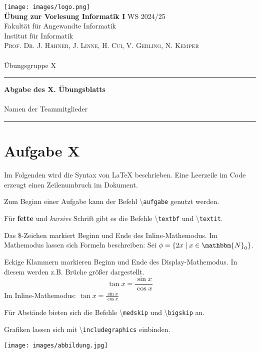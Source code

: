 \documentclass[paper=a4, %
         fontsize=10pt,  %
         oneside,        %
         headsepline,    %
         notitlepage     %
]{scrartcl}              %
\newcommand{\ownline}{\vspace{.7em}\hrule\vspace{.7em}}
\newcommand{\aufgabe}[1]{\section*{Aufgabe #1}}
\begin{document}
\texttt{[image: images/logo.png]} \\
\textbf{Übung zur Vorlesung Informatik I} \hfill{WS 2024/25} \\  
Fakultät für Angewandte Informatik \\
Institut für Informatik \\
\textsc{Prof. Dr. J. Hähner, J. Linne, H. Cui, V. Gerling, N. Kemper} \\
\mbox{} \\
{\large Übungsgruppe X} %
\ownline
\begin{center}
{\LARGE \textbf{Abgabe des X. Übungsblatts}} \\ %
\mbox{} \\
{\large Namen der Teammitglieder} \\ %
\end{center}
\ownline



\aufgabe{X}

Im Folgenden wird die Syntax von LaTeX beschrieben.
Eine Leerzeile im Code erzeugt einen Zeilenumbruch im Dokument.

Zum Beginn einer Aufgabe kann der Befehl \textbackslash\texttt{aufgabe} genutzt werden.

Für \textbf{fette} und \textit{kursive} Schrift gibt es die Befehle \textbackslash\texttt{textbf} und \textbackslash\texttt{textit}.

Das \$-Zeichen markiert Beginn und Ende des Inline-Mathemodus.
Im Mathemodus lassen sich Formeln beschreiben:
Sei $\phi = \{ 2x \mid x \in \mathbbm{N}_0 \}$.

Eckige Klammern markieren Beginn und Ende des Display-Mathemodus.
In diesem werden z.B. Brüche größer dargestellt.
\[ \tan x = \frac{\sin x}{ \cos x} \]
Im Inline-Mathemodus: $\tan x = \frac{\sin x}{ \cos x}$

\bigskip
Für Abstände bieten sich die Befehle \textbackslash\texttt{medskip} und \textbackslash\texttt{bigskip} an.

\bigskip
Grafiken lassen sich mit \textbackslash\texttt{includegraphics} einbinden.

\begin{center}
\texttt{[image: images/abbildung.jpg]}
\end{center}
\end{document}
